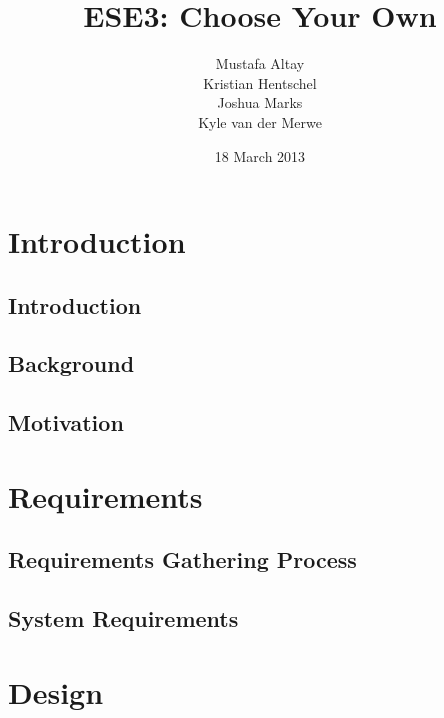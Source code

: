\documentclass{l3proj}
\begin{document}
\title{ESE3: Choose Your Own}
\author{Mustafa Altay\\
        Kristian Hentschel \\
        Joshua Marks \\
        Kyle van der Merwe}
\date{18 March 2013}
\maketitle
\begin{abstract}

\end{abstract}
\educationalconsent
\tableofcontents
\chapter{Introduction}
\label{intro}

\section{Introduction}


\section{Background}


\section{Motivation}


\chapter{Requirements}
\label{requirements}


\section{Requirements Gathering Process}
\label{sec:gathering}


\section{System Requirements}
\label{sec:system}

\chapter{Design}
\label{chap:design}
\end{document}
